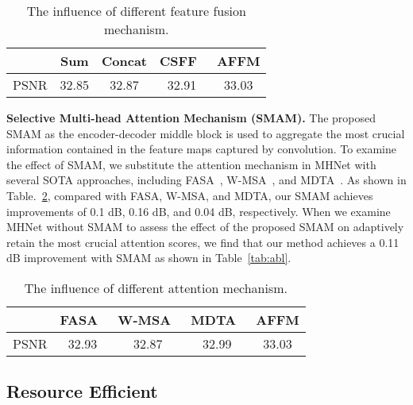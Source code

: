 \documentclass[lettersize,journal]{IEEEtran}
\begin{document}
\begin{table}
\caption{The influence of different  feature fusion mechanism.}
\label{tb:ffm}
    \centering
    \begin{tabular}{ccccc}
         \hline
          & Sum  & Concat  & CSFF~\cite{Zamir2021MPRNet}& AFFM
        \\
        \hline
        PSNR & 32.85 & 32.87 & 32.91& 33.03
         \\
         \hline
    \end{tabular}
\end{table}

\textbf{Selective Multi-head Attention Mechanism (SMAM).} The proposed SMAM as the encoder-decoder middle block  is used to  aggregate the  most crucial information contained in the feature maps captured by convolution. To examine the effect of SMAM, we substitute the  attention mechanism in MHNet with several SOTA approaches, including FASA~\cite{kong2023efficient}, W-MSA~\cite{Wang_2022_CVPR}, and MDTA~\cite{Zamir2021Restormer}. As shown in Table.~\ref{tb:amabl}, compared with FASA, W-MSA, and MDTA, our SMAM achieves improvements of 0.1 dB, 0.16 dB, and 0.04 dB, respectively. When we examine MHNet without SMAM to assess the effect of the proposed SMAM on adaptively retain the most crucial attention scores, we find that our method achieves a 0.11 dB improvement with SMAM as shown in Table~\ref{tab:abl}.
\begin{table}
\caption{The influence of different  attention mechanism.}
\label{tb:amabl}
    \centering
    \begin{tabular}{ccccc}
         \hline
           & FASA~\cite{kong2023efficient}  & W-MSA~\cite{Wang_2022_CVPR}  & MDTA~\cite{Zamir2021Restormer}& AFFM
        \\
        \hline
        PSNR  &32.93 &32.87 &32.99  & 33.03
         \\
         \hline
    \end{tabular}
\end{table}










\subsection{Resource Efficient}
\end{document}
